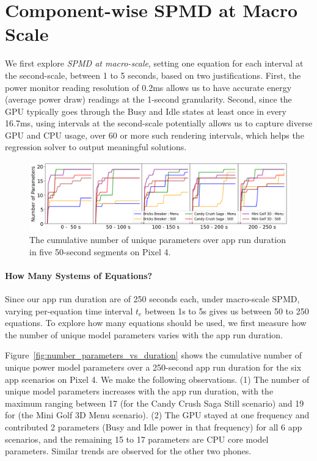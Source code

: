 \section{Component-wise SPMD at Macro Scale}
\label{sec:modelling_macro}

We first explore {\em SPMD at macro-scale}, \ie setting one equation
for each interval at the second-scale, \eg between 1 to 5 seconds,
based on two justifications.  First, the power monitor reading
resolution of 0.2ms allows us to have accurate energy (average power
draw) readings at the 1-second granularity. Second, since the GPU
typically goes through the Busy and Idle states at least once in every
16.7ms, using intervals at the second-scale potentially allows us to capture 
diverse GPU and CPU usage, \eg over 
60 or more such rendering intervals, which helps
the regression solver to output meaningful solutions.


\begin{figure}[tb]
    \centering
    \includegraphics[width=\textwidth]{figures/004_Pixel4_cummulative_parameters.png}
    \vspace{-0.2in}
    \caption{The cumulative number of unique parameters over app run duration in five 50-second segments on Pixel 4.}
    \label{fig:number_parameters_vs_duration_100s}
    \vspace{-0.1in}
\end{figure}

\paragraph{How Many Systems of Equations?}
\label{subsec:relation}
Since our app run duration are of 250 seconds each, under macro-scale
SPMD, varying per-equation time interval $t_e$ between 1s to 5s gives us
between 50 to 250 equations. To explore how many equations should be
used, we first measure how the number of unique model parameters
varies with the app run duration.

Figure~\ref{fig:number_parameters_vs_duration} shows the cumulative
number of unique power model parameters over a 250-second app run
duration for the six app scenarios on Pixel 4. We make the following
observations.
(1) The number of unique model parameters increases with the app run
duration, with the maximum ranging between 17 (for the Candy Crush Saga Still
scenario) and 19 for (the Mini Golf 3D Menu scenario).
(2) The GPU stayed at one frequency and contributed 2 parameters (Busy
and Idle power in that frequency) for all 6 app scenarios, and the
remaining 15 to 17 parameters are CPU core model parameters.  Similar
trends are observed for the other two phones.

